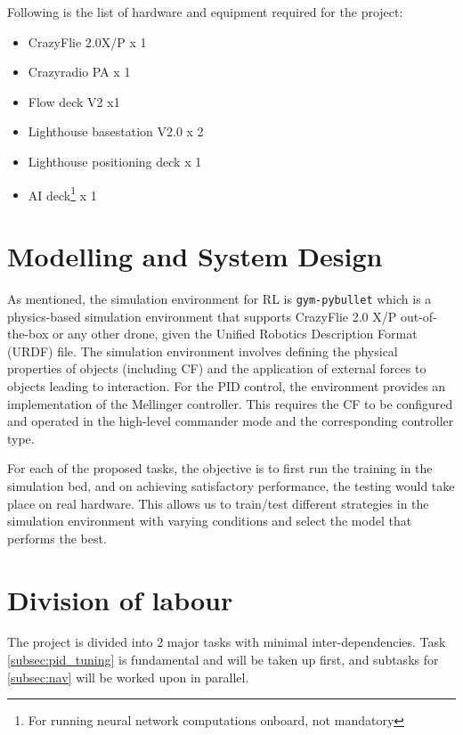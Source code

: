 \documentclass{article}
\begin{document}
Following is the list of hardware and equipment required for the project:

\begin{itemize}
	\item CrazyFlie 2.0X/P x 1
	\item Crazyradio PA x 1
	\item Flow deck V2 x1
	\item Lighthouse basestation V2.0 x 2
	\item Lighthouse positioning deck x 1
	\item AI deck\footnote{For running neural network computations onboard, not mandatory} x 1
\end{itemize}


\section{Modelling and System Design}

As mentioned, the simulation environment for RL is \verb|gym-pybullet| which is a physics-based simulation environment that supports CrazyFlie 2.0 X/P out-of-the-box or any other drone, given the Unified Robotics Description Format (URDF) file. The simulation environment involves defining the physical properties of objects (including CF) and the application of external forces to objects leading to interaction. For the PID control, the environment provides an implementation of the Mellinger controller\cite{mellinger}. This requires the CF to be configured and operated in the high-level commander mode and the corresponding controller type.

For each of the proposed tasks, the objective is to first run the training in the simulation bed, and on achieving satisfactory performance, the testing would take place on real hardware. This allows us to train/test different strategies in the simulation environment with varying conditions and select the model that performs the best.

\section{Division of labour} \label{sec:division}

The project is divided into 2 major tasks with minimal inter-dependencies. Task \ref{subsec:pid_tuning} is fundamental and will be taken up first, and subtasks for \ref{subsec:nav} will be worked upon in parallel.
\end{document}

